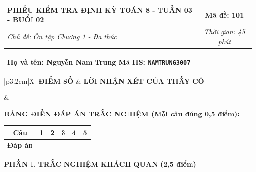 \documentclass[12pt,a4paper]{article}
\begin{document}
\newpage



\noindent
\begin{tabularx}{\linewidth}{|X|c|}
\hline
\textbf{PHIẾU KIỂM TRA ĐỊNH KỲ TOÁN 8 - TUẦN 03 - BUỔI 02} & \textbf{Mã đề: 101} \\
\textit{Chủ đề: Ôn tập Chương 1 - Đa thức} & \textit{Thời gian: 45 phút} \\
\hline
\end{tabularx}

\vspace{1mm}

\noindent
\begin{tabularx}{\linewidth}{|X|}
\hline
\rule[-2mm]{0pt}{7.5mm}\textbf{Họ và tên:} \textbf{\large Nguyễn Nam Trung} \hfill \textbf{Mã HS:} \texttt{NAMTRUNG3007} \quad \\
\hline
\end{tabularx}

\vspace{1mm}

\noindent
\begin{tabularx}{\linewidth}{|p{3.2cm}|X|}
\hline
\centering\textbf{ĐIỂM SỐ} & \centering\textbf{LỜI NHẬN XÉT CỦA THẦY CÔ} \tabularnewline
\hline
\rule{0pt}{1.3cm} & \tabularnewline
\hline
\end{tabularx}

\vspace{1.2mm}

\noindent\textbf{BẢNG ĐIỀN ĐÁP ÁN TRẮC NGHIỆM (Mỗi câu đúng 0,5 điểm):}
\vspace{0.8mm}

\noindent
\renewcommand{\arraystretch}{1.35}
\begin{tabularx}{\linewidth}{|c|*{5}{>{\centering\arraybackslash}X|}}
\hline
\textbf{Câu} & \textbf{1} & \textbf{2} & \textbf{3} & \textbf{4} & \textbf{5} \\
\hline
\textbf{Đáp án} & & & & & \\
\hline
\end{tabularx}
\renewcommand{\arraystretch}{1.0}

\vspace{1.5mm}

\noindent\textbf{\large PHẦN I. TRẮC NGHIỆM KHÁCH QUAN (2,5 điểm)}
\vspace{1mm}
\end{document}
